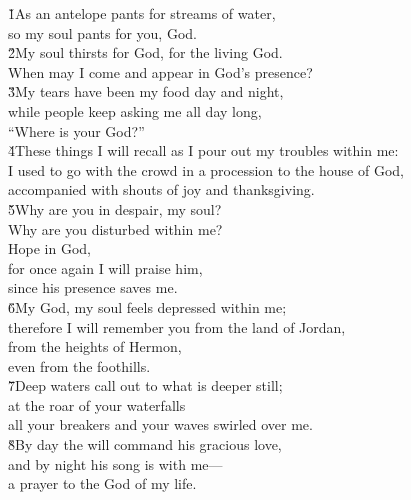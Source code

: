 \begin{poetry}
\poeml \v{1}As an antelope pants for streams of water, \\
\poemll    so my soul pants for you, God. \\
\poeml \v{2}My soul thirsts for God, for the living God. \\
\poemll    When may I come and appear in God's presence? \\
\poeml \v{3}My tears have been my food day and night, \\
\poemll    while people keep asking me all day long, \\
\poemlll       ``Where is your God?'' \\
\poeml \v{4}These things I will recall as I pour out my troubles within me: \\
\poemll    I used to go with the crowd in a procession to the house of God, \\
\poemlll       accompanied with shouts of joy and thanksgiving. \\
\poeml \v{5}Why are you in despair, my soul? \\
\poemll    Why are you disturbed within me? \\
\poeml Hope in God, \\
\poemll    for once again I will praise him, \\
\poemlll       since his presence saves me. \\
\poeml \v{6}My God, my soul feels depressed within me; \\
\poemll    therefore I will remember you from the land of Jordan, \\
\poeml from the heights of Hermon, \\
\poemll    even from the foothills. \\
\poeml \v{7}Deep waters call out to what is deeper still; \\
\poemll    at the roar of your waterfalls \\
\poemlll       all your breakers and your waves swirled over me. \\
\poeml \v{8}By day the  will command his gracious love, \\
\poemll    and by night his song is with me--- \\
\poemlll       a prayer to the God of my life. \\

\end{poetry}

